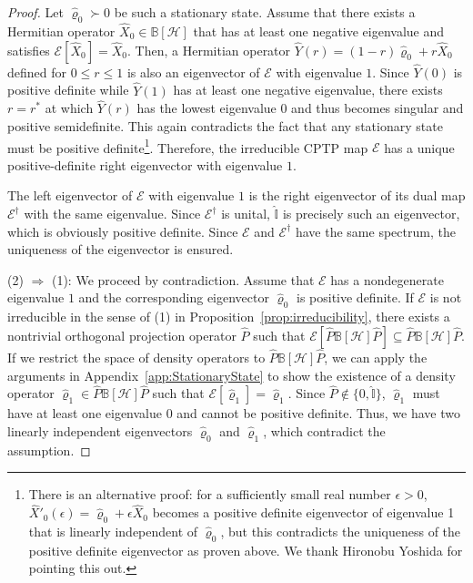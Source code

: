 \documentclass[preprint,pteplogo]{ptephy_v2}%
\numberwithin{equation}{section}
\theoremstyle{definition}
\newcommand{\mc}[1]{\mathcal{#1}}
\newcommand{\mbb}[1]{\mathbb{#1}}
\begin{document}
\begin{proof}
Let $\hat{\varrho}_0 \succ 0$ be such a stationary state.
Assume that there exists a Hermitian operator $\hat{X}_0 \in \mbb{B}[\mc{H}]$ that has at least one negative eigenvalue and satisfies $\mc{E}[\hat{X}_0] = \hat{X}_0$. 
Then, a Hermitian operator $\hat{Y}(r) = (1-r) \hat{\varrho}_0 + r\hat{X}_0$ defined for $0 \leq r \leq 1$ is also an eigenvector of $\mc{E}$ with eigenvalue $1$.
Since $\hat{Y}(0)$ is positive definite while $\hat{Y}(1)$ has at least one negative eigenvalue, there exists $r=r^*$ at which $\hat{Y}(r)$ has the lowest eigenvalue $0$ and thus becomes singular and positive semidefinite.
This again contradicts the fact that any stationary state must be positive definite\footnote{
There is an alternative proof: for a sufficiently small real number $\epsilon>0$, $\hat{X}'_0(\epsilon) = \hat{\varrho}_0 + \epsilon \hat{X}_0$ becomes a positive definite eigenvector of eigenvalue 1 that is linearly independent of $\hat{\varrho}_0$, but this contradicts the uniqueness of the positive definite eigenvector as proven above. 
We thank Hironobu Yoshida for pointing this out.
}.
Therefore, the irreducible CPTP map $\mc{E}$ has a unique positive-definite right eigenvector with eigenvalue $1$.

The left eigenvector of $\mc{E}$ with eigenvalue $1$ is the right eigenvector of its dual map $\mc{E}^\dagger$ with the same eigenvalue. 
Since $\mc{E}^\dagger$ is unital, $\hat{\mbb{I}}$ is precisely such an eigenvector, which is obviously positive definite.
Since $\mc{E}$ and $\mc{E}^\dagger$ have the same spectrum, the uniqueness of the eigenvector is ensured.

(2) $\Rightarrow$ (1): 
We proceed by contradiction.
Assume that $\mc{E}$ has a nondegenerate eigenvalue $1$ and the corresponding eigenvector $\hat{\varrho}_0$ is positive definite.
If $\mc{E}$ is not irreducible in the sense of (1) in Proposition~\ref{prop:irreducibility}, there exists a nontrivial orthogonal projection operator $\hat{P}$ such that $\mc{E}[\hat{P} \mbb{B}[\mc{H}] \hat{P}] \subseteq \hat{P} \mbb{B}[\mc{H}] \hat{P}$. 
If we restrict the space of density operators to $\hat{P} \mbb{B}[\mc{H}] \hat{P}$, we can apply the arguments in Appendix~\ref{app:StationaryState} to show the existence of a density operator $\hat{\varrho}_1 \in \hat{P} \mbb{B}[\mc{H}] \hat{P}$ such that $\mc{E}[\hat{\varrho}_1] = \hat{\varrho}_1$.
Since $\hat{P} \notin \{0 , \hat{\mbb{I}} \}$, $\hat{\varrho}_1$ must have at least one eigenvalue $0$ and cannot be positive definite.
Thus, we have two linearly independent eigenvectors $\hat{\varrho}_0$ and $\hat{\varrho}_1$, which contradict the assumption.
\end{proof}
\end{document}
